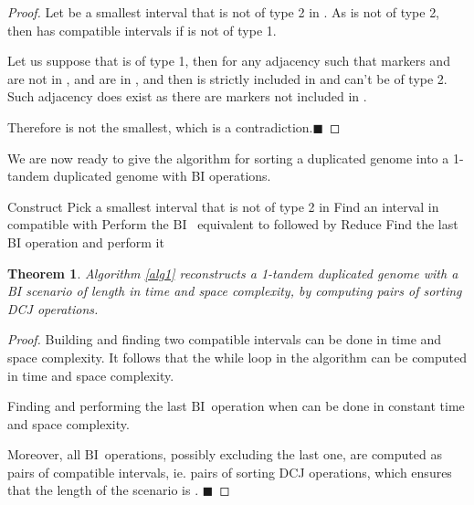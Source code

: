 \documentclass[11pt,final,twoside,nofrench]{thlifl}
\newcommand{\qed}{\ensuremath{\blacksquare}}
\def\BI{\ensuremath{\mbox{BI}}}
\newtheorem{proof}{Proof}
\newtheorem{theorem}{Theorem}
\begin{document}
{\begin{proof}
    Let  be a smallest interval that is not of type 2 in
    . As  is not of type 2, then  has compatible
    intervals if  is not of type 1.

Let us suppose that  is of type 1, then for any adjacency  such 
that markers  and  are not in ,   and  are in , 
and then  is strictly included in  and  can't be of 
type 2. Such adjacency does exist as there are  markers not included in .

Therefore  is not the smallest, which is a contradiction.\qed

\end{proof}

We are now ready to give the algorithm for sorting a duplicated genome  into a 1-tandem duplicated genome with  BI operations.

\begin{algorithm}                      \caption{Reconstruction of a 1-tandem duplicated genome}          \label{alg1}                           \begin{algorithmic}[1]                    

\STATE Construct 
\STATE Pick a smallest interval  that is not of type 2 in 
\STATE Find an interval  in  compatible with 
\STATE Perform the \BI ~ equivalent to  followed by 
\STATE Reduce 
\ENDWHILE
{}
\STATE Find the last BI operation and perform it
\ENDIF
\end{algorithmic}
\end{algorithm}

\begin{theorem}

Algorithm \ref{alg1} reconstructs a 1-tandem duplicated genome with a BI scenario of length  in  time and space complexity, by computing pairs of sorting DCJ operations.
\end{theorem}

\begin{proof}

Building  and finding two compatible intervals can be done in  time and space complexity. It follows that the while loop in the algorithm can be computed in  time and space complexity.

Finding and performing the last \BI~operation when   can be done in constant time and space complexity.

Moreover, all \BI~operations, possibly excluding the last one, are computed as 
pairs of compatible intervals, ie. pairs of sorting DCJ operations, which ensures that the length of the scenario 
is . \qed
\end{proof}

}
\end{document}
